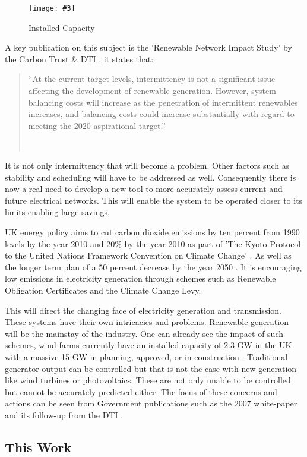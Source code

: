 \documentclass[a4paper,oneside,12pt]{report}
\newcommand{\image}[3] {
  \begin{figure}
    \begin{center}
      \texttt{[image: \#3]}
      \caption{#2}
      \label{#1}
    \end{center}
  \end{figure}
}
\newcommand{\tmpquotecite}{}%
\newenvironment{myquote}[1][]
{\renewcommand{\tmpquotecite}{#1}\begin{quote}\begin{itshape}``}
{''\end{itshape}~{\normalfont~\tmpquotecite}\end{quote}}
\begin{document}
\image{installedcapacity}{Installed Capacity}{installedcapacity.png}

A key publication on this subject is the 'Renewable Network Impact Study' by the Carbon Trust \& DTI \cite{Trust2005}, it states that:

\begin{myquote}[\cite{Trust2005}]At the current target levels, intermittency is not a significant issue affecting the development of renewable generation. However, system balancing costs will increase as the penetration of intermittent renewables increases, and balancing costs could increase substantially with regard to meeting the 2020 aspirational target.\end{myquote}

It is not only intermittency that will become a problem. Other factors such as stability and scheduling will have to be addressed as well. Consequently there is now a real need to develop a new tool to more accurately assess current and future electrical networks. This will enable the system to be operated closer to its limits enabling large savings.

UK energy policy aims to cut carbon dioxide emissions by ten percent from 1990 levels by the year 2010 and 20\% by the year 2010 as part of 'The Kyoto Protocol to the United Nations Framework Convention on Climate Change' \cite{NATIONS1998}. As well as the longer term plan of a 50 percent decrease by the year 2050 \cite{DTI2007}. It is encouraging low emissions in electricity generation through schemes such as Renewable Obligation Certificates and the Climate Change Levy.

This will direct the changing face of electricity generation and transmission. These systems have their own intricacies and problems. Renewable generation will be the mainstay of the industry. One can already see the impact of such schemes, wind farms currently have an installed capacity of 2.3 GW in the UK with a massive 15 GW in planning, approved, or in construction \cite{BWEA}. Traditional generator output can be controlled but that is not the case with new generation like wind turbines or photovoltaics. These are not only unable to be controlled but cannot be accurately predicted either. The focus of these concerns and actions can be seen from Government publications such as the 2007 white-paper \cite{DTI2007} and its follow-up from the DTI \cite{DTI2007a}.

\subsection{This Work}
\end{document}
